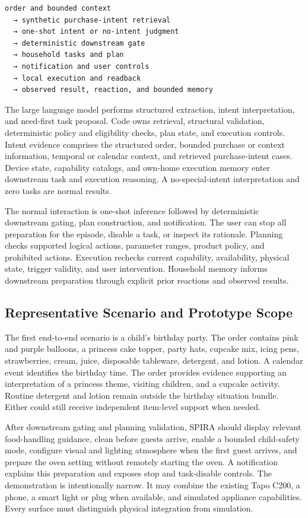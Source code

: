 \documentclass[conference]{IEEEtran}
\begin{document}
\begin{lstlisting}
order and bounded context
  → synthetic purchase-intent retrieval
  → one-shot intent or no-intent judgment
  → deterministic downstream gate
  → household tasks and plan
  → notification and user controls
  → local execution and readback
  → observed result, reaction, and bounded memory
\end{lstlisting}
The large language model performs structured extraction, intent interpretation, and need-first task proposal. Code owns retrieval, structural validation, deterministic policy and eligibility checks, plan state, and execution controls. Intent evidence comprises the structured order, bounded purchase or context information, temporal or calendar context, and retrieved purchase-intent cases. Device state, capability catalogs, and own-home execution memory enter downstream task and execution reasoning. A no-special-intent interpretation and zero tasks are normal results.

The normal interaction is one-shot inference followed by deterministic downstream gating, plan construction, and notification. The user can stop all preparation for the episode, disable a task, or inspect its rationale. Planning checks supported logical actions, parameter ranges, product policy, and prohibited actions. Execution rechecks current capability, availability, physical state, trigger validity, and user intervention. Household memory informs downstream preparation through explicit prior reactions and observed results.

\subsection{Representative Scenario and Prototype Scope}
The first end-to-end scenario is a child's birthday party. The order contains pink and purple balloons, a princess cake topper, party hats, cupcake mix, icing pens, strawberries, cream, juice, disposable tableware, detergent, and lotion. A calendar event identifies the birthday time. The order provides evidence supporting an interpretation of a princess theme, visiting children, and a cupcake activity. Routine detergent and lotion remain outside the birthday situation bundle. Either could still receive independent item-level support when needed.

After downstream gating and planning validation, SPIRA should display relevant food-handling guidance, clean before guests arrive, enable a bounded child-safety mode, configure visual and lighting atmosphere when the first guest arrives, and prepare the oven setting without remotely starting the oven. A notification explains this preparation and exposes stop and task-disable controls. The demonstration is intentionally narrow. It may combine the existing Tapo C200, a phone, a smart light or plug when available, and simulated appliance capabilities. Every surface must distinguish physical integration from simulation.
\end{document}
